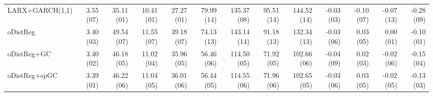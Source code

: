 \begin{tabular}{lrrrrrrrrrrrr}
LARX+GARCH(1,1) & {\cellcolor[HTML]{DAC9C9}} \color[HTML]{000000} 3.55 (07) & {\cellcolor[HTML]{008080}} \color[HTML]{F1F1F1} 35.11 (01) & {\cellcolor[HTML]{008080}} \color[HTML]{F1F1F1} 10.41 (01) & {\cellcolor[HTML]{008080}} \color[HTML]{F1F1F1} 27.27 (01) & {\cellcolor[HTML]{CD5F5F}} \color[HTML]{F1F1F1} 79.99 (14) & {\cellcolor[HTML]{D3D8D8}} \color[HTML]{000000} 135.37 (08) & {\cellcolor[HTML]{D17C7C}} \color[HTML]{F1F1F1} 95.51 (14) & {\cellcolor[HTML]{D38B8B}} \color[HTML]{F1F1F1} 144.52 (14) & {\cellcolor[HTML]{1D8C8C}} \color[HTML]{F1F1F1} -0.03 (03) & {\cellcolor[HTML]{D9C1C1}} \color[HTML]{000000} -0.10 (07) & {\cellcolor[HTML]{D7B1B1}} \color[HTML]{000000} -0.07 (13) & {\cellcolor[HTML]{D1D7D7}} \color[HTML]{000000} -0.28 (09) \\
oDistReg & {\cellcolor[HTML]{138888}} \color[HTML]{F1F1F1} 3.40 (03) & {\cellcolor[HTML]{DCD8D8}} \color[HTML]{000000} 49.54 (07) & {\cellcolor[HTML]{7BB3B3}} \color[HTML]{F1F1F1} 11.55 (07) & {\cellcolor[HTML]{DCDBDB}} \color[HTML]{000000} 39.18 (07) & {\cellcolor[HTML]{D39393}} \color[HTML]{F1F1F1} 74.13 (13) & {\cellcolor[HTML]{D9C0C0}} \color[HTML]{000000} 143.14 (14) & {\cellcolor[HTML]{D59C9C}} \color[HTML]{F1F1F1} 91.18 (13) & {\cellcolor[HTML]{D8BBBB}} \color[HTML]{000000} 132.34 (13) & {\cellcolor[HTML]{379797}} \color[HTML]{F1F1F1} -0.03 (06) & {\cellcolor[HTML]{A9C7C7}} \color[HTML]{000000} 0.03 (05) & {\cellcolor[HTML]{008080}} \color[HTML]{F1F1F1} 0.00 (01) & {\cellcolor[HTML]{008080}} \color[HTML]{F1F1F1} -0.10 (01) \\
oDistReg+GC & {\cellcolor[HTML]{078383}} \color[HTML]{F1F1F1} 3.40 (02) & {\cellcolor[HTML]{B3CBCB}} \color[HTML]{000000} 46.18 (05) & {\cellcolor[HTML]{429B9B}} \color[HTML]{F1F1F1} 11.02 (04) & {\cellcolor[HTML]{A9C7C7}} \color[HTML]{000000} 35.96 (05) & {\cellcolor[HTML]{188A8A}} \color[HTML]{F1F1F1} 56.46 (06) & {\cellcolor[HTML]{269090}} \color[HTML]{F1F1F1} 114.50 (05) & {\cellcolor[HTML]{2D9393}} \color[HTML]{F1F1F1} 71.92 (05) & {\cellcolor[HTML]{238E8E}} \color[HTML]{F1F1F1} 102.66 (06) & {\cellcolor[HTML]{4CA0A0}} \color[HTML]{F1F1F1} -0.04 (09) & {\cellcolor[HTML]{70AFAF}} \color[HTML]{F1F1F1} 0.02 (03) & {\cellcolor[HTML]{CFD7D7}} \color[HTML]{000000} -0.02 (06) & {\cellcolor[HTML]{489E9E}} \color[HTML]{F1F1F1} -0.15 (04) \\
oDistReg+spGC & {\cellcolor[HTML]{008080}} \color[HTML]{F1F1F1} 3.39 (01) & {\cellcolor[HTML]{B3CBCB}} \color[HTML]{000000} 46.22 (06) & {\cellcolor[HTML]{459D9D}} \color[HTML]{F1F1F1} 11.04 (05) & {\cellcolor[HTML]{A9C7C7}} \color[HTML]{000000} 36.01 (06) & {\cellcolor[HTML]{168989}} \color[HTML]{F1F1F1} 56.44 (05) & {\cellcolor[HTML]{269090}} \color[HTML]{F1F1F1} 114.55 (06) & {\cellcolor[HTML]{2F9393}} \color[HTML]{F1F1F1} 71.96 (06) & {\cellcolor[HTML]{238E8E}} \color[HTML]{F1F1F1} 102.65 (05) & {\cellcolor[HTML]{379797}} \color[HTML]{F1F1F1} -0.03 (06) & {\cellcolor[HTML]{A9C7C7}} \color[HTML]{000000} 0.03 (05) & {\cellcolor[HTML]{BACECE}} \color[HTML]{000000} -0.02 (05) & {\cellcolor[HTML]{399898}} \color[HTML]{F1F1F1} -0.13 (03) \\

\end{tabular}
